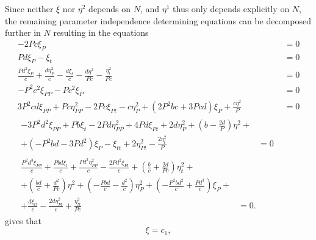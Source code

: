 Since neither \(\xi\) nor \(\eta^2\) depends on \(N\), and \(\eta^1\) thus only depends explicitly on \(N\), the remaining parameter independence determining equations  can be decomposed further in \(N\) resulting in the equations
\begin{subequations}
  \begin{align}
    - 2 P c \xi_{P} &= 0 \label{eq:lotka-volterra-det-aN-a}\\
    P d \xi_{P} - \xi_{t} &= 0 \label{eq:lotka-volterra-det-aN-b}\\
    \frac{P d^{2} \xi_{P}}{c} + \frac{d \eta^2_{P}}{c} - \frac{d \xi_{t}}{c} - \frac{d \eta^{2}}{P c} - \frac{\eta^2_{t}}{P c} &= 0 \label{eq:lotka-volterra-det-aN-c}\\
    - P^{2} c^{2} \xi_{PP} - P c^{2} \xi_{P} &= 0 \label{eq:lotka-volterra-det-aN-d}\\
    3 P^{2} c d \xi_{PP} + P c \eta^2_{PP} - 2 P c \xi_{Pt} - c \eta^2_{P} + \left(2 P^{2} b c + 3 P c d\right) \xi_{P} + \frac{c \eta^{2}}{P} &= 0 \label{eq:lotka-volterra-det-aN-e}\\
    \begin{split}\label{eq:lotka-volterra-det-aN-f}
      - 3 P^{2} d^{2} \xi_{PP} + P b \xi_{t} - 2 P d \eta^2_{PP} + 4 P d \xi_{Pt} + 2 d \eta^2_{P} + \left(b - \frac{2 d}{P}\right) \eta^{2} +&\\
      + \left(- P^{2} b d - 3 P d^{2}\right) \xi_{P} - \xi_{tt} + 2 \eta^2_{Pt} - \frac{2 \eta^2_{t}}{P} &= 0
    \end{split}\\
    \begin{split}\label{eq:lotka-volterra-det-aN-g}
      \frac{P^{2} d^{3} \xi_{PP}}{c} + \frac{P b d \xi_{t}}{c} + \frac{P d^{2} \eta^2_{PP}}{c} - \frac{2 P d^{2} \xi_{Pt}}{c} + \left(\frac{b}{c} + \frac{2 d}{P c}\right) \eta^2_{t} +&\\
      + \left(\frac{b d}{c} + \frac{d^{2}}{P c}\right) \eta^{2} + \left(- \frac{P b d}{c} - \frac{d^{2}}{c}\right) \eta^2_{P} + \left(- \frac{P^{2} b d^{2}}{c} + \frac{P d^{3}}{c}\right) \xi_{P} +&\\
      + \frac{d \xi_{tt}}{c} - \frac{2 d \eta^2_{Pt}}{c} + \frac{\eta^2_{tt}}{P c} &= 0.
    \end{split}
  \end{align}
\end{subequations}
 gives that
\begin{equation}
  \xi = c_1,
\end{equation}
